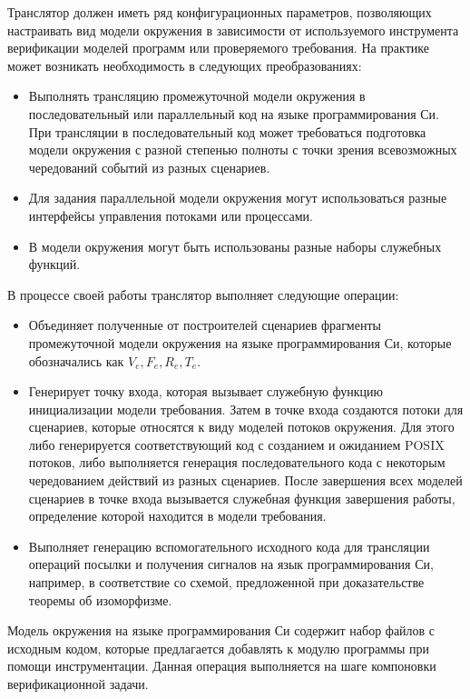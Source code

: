 Транслятор должен иметь ряд конфигурационных параметров, позволяющих настраивать вид модели окружения в зависимости от используемого инструмента верификации моделей программ или проверяемого требования.
На практике может возникать необходимость в следующих преобразованиях:
\begin{itemize}
    \item Выполнять трансляцию промежуточной модели окружения в последовательный или параллельный код на языке программирования Си. 
    При трансляции в последовательный код может требоваться подготовка модели окружения с разной степенью полноты с точки зрения всевозможных чередований событий из разных сценариев.
    \item Для задания параллельной модели окружения могут использоваться разные интерфейсы управления потоками или процессами.
    \item В модели окружения могут быть использованы разные наборы служебных функций.
\end{itemize}

В процессе своей работы транслятор выполняет следующие операции:
\begin{itemize}
    \item Объединяет полученные от построителей сценариев фрагменты промежуточной модели окружения на языке программирования Си, которые обозначались как $V_e, F_e, R_e, T_e$.
    \item Генерирует точку входа, которая вызывает служебную функцию инициализации модели требования.
    Затем в точке входа создаются потоки для сценариев, которые относятся к виду моделей потоков окружения.
    Для этого либо генерируется соответствующий код с созданием и ожиданием POSIX потоков, либо выполняется генерация последовательного кода с некоторым чередованием действий из разных сценариев.
    После завершения всех моделей сценариев в точке входа вызывается служебная функция завершения работы, определение которой находится в модели требования.
    \item Выполняет генерацию вспомогательного исходного кода для трансляции операций посылки и получения сигналов на язык программирования Си, например, в соответствие со схемой, предложенной при доказательстве теоремы об изоморфизме.
\end{itemize}

Модель окружения на языке программирования Си содержит набор файлов с исходным кодом, которые предлагается добавлять к модулю программы при помощи инструментации.
Данная операция выполняется на шаге компоновки верификационной задачи.

